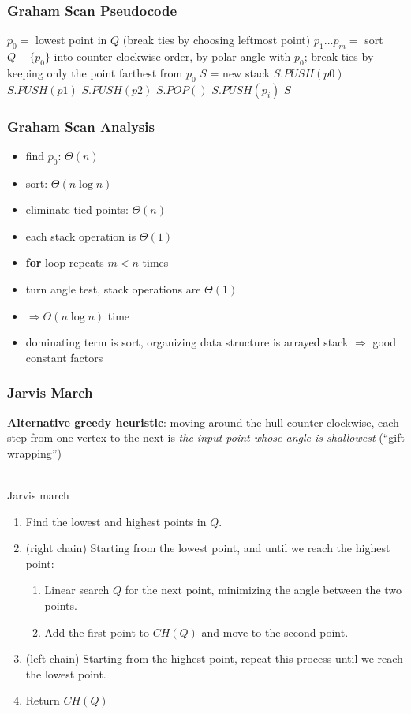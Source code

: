 \documentclass{beamer}
\newcommand{\stanza}{ \\~\ }
\begin{document}
\begin{frame} \frametitle{Graham Scan Pseudocode}
  {\small
\begin{algorithmic}[1]
   
    \State $p_0 = $ lowest point in $Q$ (break ties by choosing leftmost point)
    \State $p_1 \ldots p_m = $ sort $Q-\{p_0\}$ into counter-clockwise order,
      by polar angle with $p_0$; break ties by keeping only the point farthest from $p_0$
    \State $S$ = new stack
    \State $S.PUSH(p0)$
    \State $S.PUSH(p1)$
    \State $S.PUSH(p2)$
        \State $S.POP()$
      \EndWhile
      \State $S.PUSH(p_i)$
    \EndFor
    \State \Return $S$
  \EndFunction
\end{algorithmic}
}
\end{frame}

\begin{frame} \frametitle{Graham Scan Analysis}
\begin{itemize}
  \item find $p_0$: $\Theta(n)$
  \item sort: $\Theta(n \log n)$
  \item eliminate tied points: $\Theta(n)$
  \item each stack operation is $\Theta(1)$
  \item \textbf{for} loop repeats $m < n$ times
  \item turn angle test, stack operations are $\Theta(1)$
  \item $\Rightarrow \Theta(n \log n)$ time
  \item dominating term is sort, organizing data structure is arrayed stack
    $\Rightarrow$ good constant factors
\end{itemize}
\end{frame}

\begin{frame} \frametitle{Jarvis March}
\textbf{Alternative greedy heuristic}: moving around the hull counter-clockwise,
 each step from one vertex to the next is
 \emph{the input point whose angle is shallowest} (``gift wrapping'') \stanza

Jarvis march
\begin{enumerate}
  \item Find the lowest and highest points in $Q$.
  \item (right chain) Starting from the lowest point, and until we reach the highest point:
    \begin{enumerate}
      \item Linear search $Q$ for the next point, minimizing the angle between
        the two points.
      \item Add the first point to $CH(Q)$ and move to the second point.
    \end{enumerate}
  \item (left chain) Starting from the highest point, repeat this process until we
    reach the lowest point.
  \item Return $CH(Q)$
\end{enumerate}
\end{frame}
\end{document}
